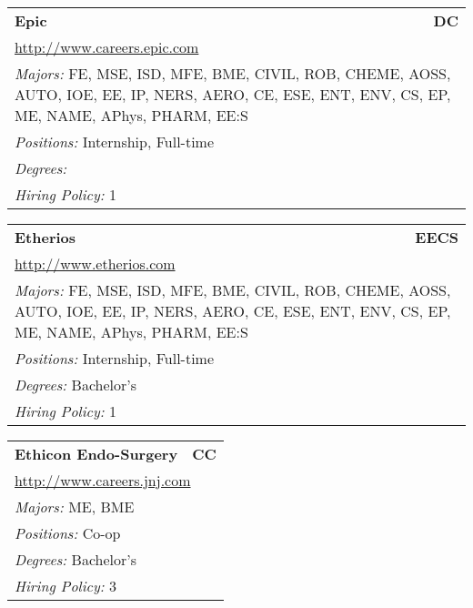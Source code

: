 \documentclass[twoside]{article}
\begin{document}
\begin{center}
\begin{multicols}{3}
\begin{FlushLeft}
\begin{minipage}{\columnwidth}\begin{tabularx}{.95\columnwidth}{Xr}
                 {\Large\bf Epic} & {\Large\bf DC}\\
    \multicolumn{2}{p{.95\columnwidth}}{\url{http://www.careers.epic.com}}\\
    \multicolumn{2}{p{.95\columnwidth}}{\emph{Majors:} FE, MSE, ISD, MFE, BME, CIVIL, ROB, CHEME, AOSS, AUTO, IOE, EE, IP, NERS, AERO, CE, ESE, ENT, ENV, CS, EP, ME, NAME, APhys, PHARM, EE:S}\\
    \multicolumn{2}{p{.95\columnwidth}}{\emph{Positions:} Internship, Full-time}\\
    \multicolumn{2}{p{.95\columnwidth}}{\emph{Degrees:} }\\
    \multicolumn{2}{p{.95\columnwidth}}{\emph{Hiring Policy:} 1}\\
    \end{tabularx}
    
\end{minipage}
 
\begin{minipage}{\columnwidth}\begin{tabularx}{.95\columnwidth}{Xr}
                 {\Large\bf Etherios} & {\Large\bf EECS}\\
    \multicolumn{2}{p{.95\columnwidth}}{\url{http://www.etherios.com}}\\
    \multicolumn{2}{p{.95\columnwidth}}{\emph{Majors:} FE, MSE, ISD, MFE, BME, CIVIL, ROB, CHEME, AOSS, AUTO, IOE, EE, IP, NERS, AERO, CE, ESE, ENT, ENV, CS, EP, ME, NAME, APhys, PHARM, EE:S}\\
    \multicolumn{2}{p{.95\columnwidth}}{\emph{Positions:} Internship, Full-time}\\
    \multicolumn{2}{p{.95\columnwidth}}{\emph{Degrees:} Bachelor's}\\
    \multicolumn{2}{p{.95\columnwidth}}{\emph{Hiring Policy:} 1}\\
    \end{tabularx}
    
\end{minipage}
 
\begin{minipage}{\columnwidth}\begin{tabularx}{.95\columnwidth}{Xr}
                 {\Large\bf Ethicon Endo-Surgery} & {\Large\bf CC}\\
    \multicolumn{2}{p{.95\columnwidth}}{\url{http://www.careers.jnj.com}}\\
    \multicolumn{2}{p{.95\columnwidth}}{\emph{Majors:} ME, BME}\\
    \multicolumn{2}{p{.95\columnwidth}}{\emph{Positions:} Co-op}\\
    \multicolumn{2}{p{.95\columnwidth}}{\emph{Degrees:} Bachelor's}\\
    \multicolumn{2}{p{.95\columnwidth}}{\emph{Hiring Policy:} 3}\\
    \end{tabularx}
    

\end{minipage}
\end{FlushLeft}
\end{multicols}
\end{center}
\end{document}

